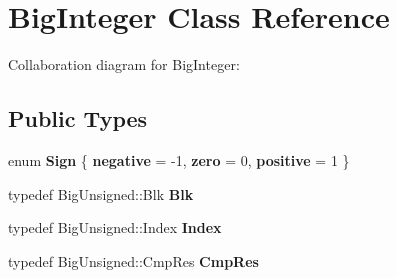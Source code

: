 \hypertarget{class_big_integer}{}\section{Big\+Integer Class Reference}
\label{class_big_integer}


Collaboration diagram for Big\+Integer\+:
\subsection*{Public Types}
\begin{DoxyCompactItemize}
\item 
\mbox{\label{class_big_integer_ab8bd05c604c2549930bd6f9169c13212}} 
enum {\bfseries Sign} \{ {\bfseries negative} = -\/1, 
{\bfseries zero} = 0, 
{\bfseries positive} = 1
 \}
\item 
\mbox{\label{class_big_integer_a087f32e1a98d13063afabbbba5ee7777}} 
typedef Big\+Unsigned\+::\+Blk {\bfseries Blk}
\item 
\mbox{\label{class_big_integer_a9211ee1ab111812c13a85946850abed4}} 
typedef Big\+Unsigned\+::\+Index {\bfseries Index}
\item 
\mbox{\label{class_big_integer_abf5f4fc1341fa57ab2247204f75107d0}} 
typedef Big\+Unsigned\+::\+Cmp\+Res {\bfseries Cmp\+Res}
\end{DoxyCompactItemize}
